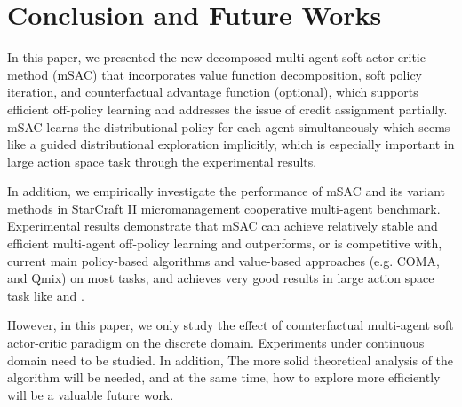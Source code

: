 \documentclass[runningheads]{llncs}
\begin{document}
\section{Conclusion and Future Works}

In this paper, we presented the new decomposed multi-agent soft actor-critic method (mSAC) that incorporates value function decomposition, soft policy iteration, and counterfactual advantage function (optional), which supports efficient off-policy learning and addresses the issue of credit assignment partially.
mSAC learns the distributional policy for each agent simultaneously which seems like a guided distributional exploration implicitly,
which is especially important in large action space task through the experimental results. 

In addition, we empirically investigate the performance of mSAC and its variant methods
in StarCraft II micromanagement cooperative multi-agent benchmark. Experimental results demonstrate that mSAC can achieve relatively stable and efficient multi-agent off-policy learning and outperforms, or is competitive with, current main policy-based algorithms and value-based approaches (e.g. COMA, and Qmix) on most tasks, and achieves very good results in large action space task like  and .

However, in this paper, we only study the effect of counterfactual multi-agent soft actor-critic paradigm on the discrete domain. 
Experiments under continuous domain need to be studied. In addition,
The more solid theoretical analysis of the algorithm will be needed, and at the same time, how to explore more efficiently will be a valuable future work. 
\end{document}
